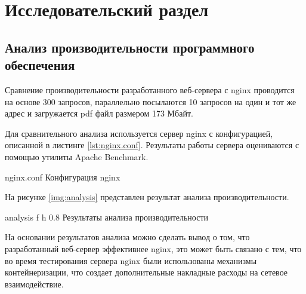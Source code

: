 \chapter{Исследовательский раздел}

\section{Анализ производительности программного обеспечения}

Сравнение производительности разработанного веб-сервера с nginx проводится на основе 300 запросов, параллельно посылаются 10 запросов на один и тот же адрес и загружается pdf файл размером 173 Мбайт.

Для сравнительного анализа используется сервер nginx с конфигурацией, описанной в листинге \ref{lst:nginx.conf}. Результаты работы сервера оцениваются с помощью утилиты Apache Benchmark.

    {nginx.conf}
    {Конфигурация nginx}

\clearpage

На рисунке \ref{img:analysis} представлен результат анализа производительности.

    {analysis}
    {f}
    {h}
    {0.8\linewidth}
    {Результаты анализа производительности}

На основании результатов анализа можно сделать вывод о том, что разработанный веб-сервер эффективнее nginx, это может быть связано с тем, что во время тестирования сервера nginx были использованы механизмы контейнеризации, что создает дополнительные накладные расходы на сетевое взаимодействие.
